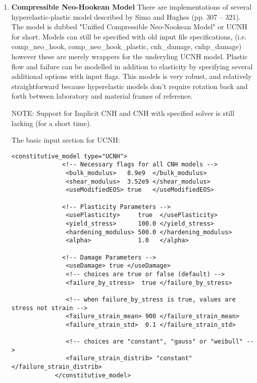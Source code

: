 \begin{enumerate}
\item{\bf Compressible Neo-Hookean Model} There are implementations of several
hyperelastic-plastic model described by Simo and Hughes\cite{simo1998} (pp. 307 -- 321). 
 The model is dubbed "Unified Compressible Neo-Nookean Model" or UCNH for short.  Models can 
still be specified with old input file specifications, (i.e. comp\_neo\_hook, comp\_neo\_hook\_plastic,
cnh\_damage, cnhp\_damage) however these are merely wrappers for the underyling UCNH model.
 Plastic flow and failure can be modelled in addition to elasticity by  specifying 
several additional options with input flags. This models is very robust, and relatively 
straightforward because hyperelastic models don't require rotation back and forth 
between laboratory and material frames of reference.

NOTE: Support for Implicit CNH and CNH with specified solver is still lacking (for a short time).

The basic input section for UCNH:

\begin{Verbatim}[fontsize=\footnotesize]
            <constitutive_model type="UCNH"> 
              <!-- Necessary flags for all CNH models -->
               <bulk_modulus>   8.9e9  </bulk_modulus>
               <shear_modulus>  3.52e9 </shear_modulus>
               <useModifiedEOS> true   </useModifiedEOS>
                
              <!-- Plasticity Parameters -->
               <usePlasticity>     true  </usePlasticity>
               <yield_stress>      100.0 </yield_stress>
               <hardening_modulus> 500.0 </hardening_modulus>
               <alpha>             1.0   </alpha>

              <!-- Damage Parameters -->
               <useDamage> true </useDamage>
               <!-- choices are true or false (default) -->
               <failure_by_stress>  true </failure_by_stress>

               <!-- when failure_by_stress is true, values are stress not strain -->
               <failure_strain_mean> 900 </failure_strain_mean>
               <failure_strain_std>  0.1 </failure_strain_std>

               <!-- choices are "constant", "gauss" or "weibull" -->
               <failure_strain_distrib> "constant" </failure_strain_distrib>
            </constitutive_model>
\end{Verbatim}



\end{enumerate}
